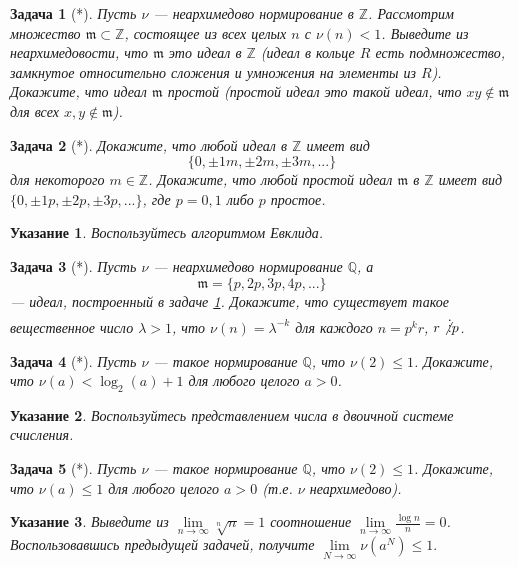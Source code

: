 \documentclass[12pt]{book}
\def\Z{{\mathbb Z}}
\def\Q{{\mathbb Q}}
\theoremstyle{upshape}
\newtheorem{zadacha}{Задача}[chapter]
\theoremstyle{generic}
\theoremstyle{upshapenonumber}
\newtheorem{ukazanie}{Указание}[section]
\newcommand{\следствие}{%
     \refstepcounter{teorema}
     {\noindent\bf Следствие \thechapter.\arabic{teorema}:\ }}
\newcommand{\пример}{%
     \refstepcounter{teorema}
     {\noindent\bf Пример \thechapter.\arabic{teorema}:\ }}
\newcommand{\лемма}{%
     \refstepcounter{teorema}
     {\noindent\bf Лемма \thechapter.\arabic{teorema}:\ }}
\newcommand{\теорема}{%
     \refstepcounter{teorema}
     {\noindent\bf Теорема \thechapter.\arabic{teorema}:\ }}
\newcommand{\утверждение}{%
     \refstepcounter{teorema}
     {\noindent\bf Утверждение \thechapter.\arabic{teorema}:\ }}
\begin{document}
{\begin{zadacha}[*]\label{_prostoj_ideal_p_ad_Zadacha_}
Пусть $\nu$ --- неархимедово
нормирование в $\Z$.
Рассмотрим множество
${\mathfrak m} \subset \Z$, состоящее из всех целых $n$ с
$\nu(n)<1$. Выведите из неархимедовости, что $\mathfrak m$ это {\em идеал} в $\Z$
(идеал в кольце $R$ есть подмножество, замкнутое относительно
сложения и умножения на элементы из $R$). Докажите, что
идеал $\mathfrak m$
{\em простой} (простой идеал это такой идеал, что $xy \notin
{\mathfrak m}$ для всех $x, y \notin {\mathfrak m}$). 
\end{zadacha}


\begin{zadacha}[*] Докажите, что любой идеал в $\Z$ 
имеет вид \[ \{0, \pm1 m, \pm 2m, \pm3m, ...\}\] для некоторого $m\in \Z$.
Докажите, что любой простой идеал ${\mathfrak m}$ 
в $\Z$ имеет вид $\{0, \pm1 p, \pm 2p, \pm3p, ...\}$, где $p=0, 1$
либо $p$ простое.
\end{zadacha}

\begin{ukazanie} Воспользуйтесь алгоритмом Евклида.
\end{ukazanie}

\begin{zadacha}[*] Пусть $\nu$ --- неархимедово нормирование $\Q$, 
а \[ \mathfrak m = \{p, 2p, 3p, 4p, ...\}\] --- 
идеал, построенный в задаче \ref{_prostoj_ideal_p_ad_Zadacha_}. 
Докажите, что существует
такое вещественное число $\lambda>1$, что $\nu(n) = \lambda^{-k}$ для
каждого $n=p^k r$, $r\not\vdots p$.
\end{zadacha}

\begin{zadacha}[*] Пусть $\nu$ --- такое нормирование $\Q$,
что $\nu(2)\leq 1$. Докажите, что $\nu(a)< \log_2 (a)+1$
для любого целого $a>0$.
\end{zadacha}

\begin{ukazanie} Воспользуйтесь представлением числа в 
двоичной системе счисления.
\end{ukazanie}

\begin{zadacha}[*] Пусть $\nu$ --- такое нормирование $\Q$,
что $\nu(2)\leq 1$. Докажите, что $\nu(a)\leq 1$
для любого целого $a>0$ (т.е. $\nu$ неархимедово).
\end{zadacha}

\begin{ukazanie} Выведите из
$\lim\limits_{n\to \infty} \sqrt[n]{n}=1$ соотношение
$\lim\limits_{n\to \infty} \frac{\log n}{n}=0$. Воспользовавшись
предыдущей задачей, получите 
$\lim\limits_{N\to \infty} \nu(a^N)\leq 1.$
\end{ukazanie}

}
\end{document}
